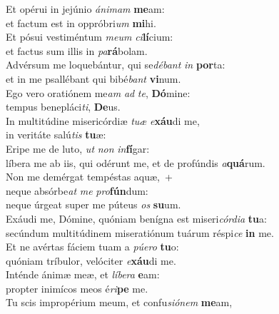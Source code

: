 \oddverse Et opérui in jejúnio \textit{á}\textit{ni}\textit{mam} \textbf{me}am:~\*\\
\oddverse et factum est in oppróbri\textit{um} \textbf{mi}hi.\\
\evenverse Et pósui vestiméntum \textit{me}\textit{um} \textit{ci}\textbf{lí}cium:~\*\\
\evenverse et factus sum illis in \textit{pa}\textbf{rá}bolam.\\
\oddverse Advérsum me loquebántur, qui se\textit{dé}\textit{bant} \textit{in} \textbf{por}ta:~\*\\
\oddverse et in me psallébant qui bibé\textit{bant} \textbf{vi}num.\\
\evenverse Ego vero oratiónem me\textit{am} \textit{ad} \textit{te}, \textbf{Dó}mine:~\*\\
\evenverse tempus benepláci\textit{ti}, \textbf{De}us.\\
\oddverse In multitúdine misericórdiæ \textit{tu}\textit{æ} \textit{e}\textbf{xáu}di me,~\*\\
\oddverse in veritáte salú\textit{tis} \textbf{tu}æ:\\
\evenverse Eripe me de luto, \textit{ut} \textit{non} \textit{in}\textbf{fí}gar:~\*\\
\evenverse líbera me ab iis, qui odérunt me, et de profúndis \textit{a}\textbf{quá}rum.\\
\oddverse Non me demérgat tempéstas aquæ,~+\\
\oddverse  neque absórbe\textit{at} \textit{me} \textit{pro}\textbf{fún}dum:~\*\\
\oddverse neque úrgeat super me púteus \textit{os} \textbf{su}um.\\
\evenverse Exáudi me, Dómine, quóniam benígna est miseri\textit{cór}\textit{di}\textit{a} \textbf{tu}a:~\*\\
\evenverse secúndum multitúdinem miseratiónum tuárum réspi\textit{ce} \textbf{in} me.\\
\oddverse Et ne avértas fáciem tuam a \textit{pú}\textit{e}\textit{ro} \textbf{tu}o:~\*\\
\oddverse quóniam tríbulor, velóciter \textit{e}\textbf{xáu}di me.\\
\evenverse Inténde ánimæ meæ, et \textit{lí}\textit{be}\textit{ra} \textbf{e}am:~\*\\
\evenverse propter inimícos meos é\textit{ri}\textbf{pe} me.\\
\oddverse Tu scis impropérium meum, et confu\textit{si}\textit{ó}\textit{nem} \textbf{me}am,~\*\\

